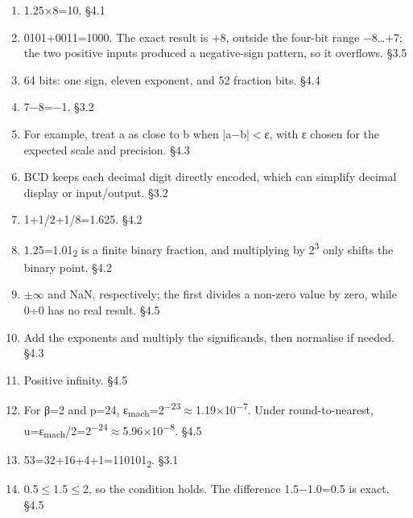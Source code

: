 \documentclass[11pt]{article}
\begin{document}
\begin{keepsection}
\begin{enumerate}
\item 1.25\ensuremath{\times}8=10. \hfill{\small\color{FAUblue}§4.1}
\item 0101+0011=1000. The exact result is +8, outside the four-bit range \ensuremath{-}8…+7; the two positive inputs produced a negative-sign pattern, so it overflows. \hfill{\small\color{FAUblue}§3.5}
\item 64 bits: one sign, eleven exponent, and 52 fraction bits. \hfill{\small\color{FAUblue}§4.4}
\item 7\ensuremath{-}8=\ensuremath{-}1. \hfill{\small\color{FAUblue}§3.2}
\item For example, treat a as close to b when |a\ensuremath{-}b|\ensuremath{<}ε, with ε chosen for the expected scale and precision. \hfill{\small\color{FAUblue}§4.3}
\item BCD keeps each decimal digit directly encoded, which can simplify decimal display or input/output. \hfill{\small\color{FAUblue}§3.2}
\item 1+1/2+1/8=1.625. \hfill{\small\color{FAUblue}§4.2}
\item 1.25=1.01\textsubscript{2} is a finite binary fraction, and multiplying by 2\textsuperscript{3} only shifts the binary point. \hfill{\small\color{FAUblue}§4.2}
\item \ensuremath{\pm}\ensuremath{\infty} and NaN, respectively; the first divides a non-zero value by zero, while 0÷0 has no real result. \hfill{\small\color{FAUblue}§4.5}
\item Add the exponents and multiply the significands, then normalise if needed. \hfill{\small\color{FAUblue}§4.3}
\item Positive infinity. \hfill{\small\color{FAUblue}§4.5}
\item For β=2 and p=24, ε\textsubscript{mach}=2\textsuperscript{\ensuremath{-}23}\ensuremath{\approx}1.19\ensuremath{\times}10\textsuperscript{\ensuremath{-}7}. Under round-to-nearest, u=ε\textsubscript{mach}/2=2\textsuperscript{\ensuremath{-}24}\ensuremath{\approx}5.96\ensuremath{\times}10\textsuperscript{\ensuremath{-}8}. \hfill{\small\color{FAUblue}§4.5}
\item 53=32+16+4+1=110101\textsubscript{2}. \hfill{\small\color{FAUblue}§3.1}
\item 0.5\ensuremath{\leq}1.5\ensuremath{\leq}2, so the condition holds. The difference 1.5\ensuremath{-}1.0=0.5 is exact. \hfill{\small\color{FAUblue}§4.5}
\end{enumerate}

\end{keepsection}
\end{document}

